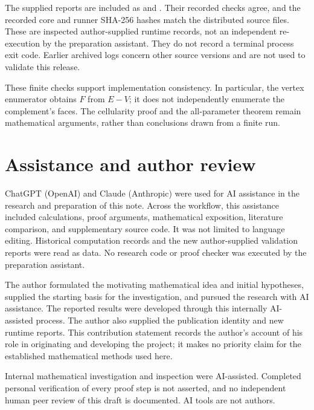 \documentclass[a4paper,11pt]{article}
\begin{document}
The supplied reports are included as 
and . Their recorded checks agree, and
the recorded core and runner SHA-256 hashes match the distributed source
files. These are inspected author-supplied runtime records, not an
independent re-execution by the preparation assistant. They do not record
a terminal process exit code. Earlier archived logs concern other source
versions and are not used to validate this release.

These finite checks support implementation consistency. In particular,
the vertex enumerator obtains $F$ from $E-V$; it does not independently
enumerate the complement's faces. The cellularity proof and the
all-parameter theorem remain mathematical arguments, rather than
conclusions drawn from a finite run.

\clearpage
\section*{Assistance and author review}
ChatGPT (OpenAI) and Claude (Anthropic) were used for AI assistance in
the research and preparation of this note. Across the workflow, this
assistance included calculations, proof arguments, mathematical exposition,
literature comparison, and supplementary source code. It was not limited to language
editing. Historical computation records and the new author-supplied
validation reports were read as data. No research code or proof checker
was executed by the preparation assistant.

The author formulated the motivating mathematical idea and initial
hypotheses, supplied the starting basis for the investigation, and pursued
the research with AI assistance. The reported results were developed
through this internally AI-assisted process. The author also supplied the
publication identity and new runtime reports. This contribution statement
records the author's account of his role in originating and developing
the project; it makes no priority claim for the established mathematical
methods used here.

Internal mathematical investigation and inspection were AI-assisted.
Completed personal verification of every proof step is not asserted, and
no independent human peer review of this draft is documented. AI tools
are not authors.
\end{document}
